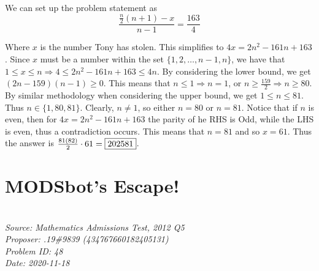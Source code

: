\documentclass[titlepage=true]{scrartcl}
\begin{document}
    \begin{solution}\hfil\medskip 
   
        We can set up the problem statement as 
        \begin{equation*}
            \frac{\frac{n}{2}(n+1)-x}{n-1}=\frac{163}{4}
        \end{equation*}
                
         Where \(x\) is the number Tony has stolen.
	 This simplifies to \(4x=2n^2-161n+163\).
	 Since \(x\) must be a number within the set \(\{1,2,\ldots,n-1,n\}\), we have that \(1\leq x\leq n\Rightarrow 4\leq 2n^2-161n+163\leq4n\).
	 By considering the lower bound, we get $(2n-159)(n-1)\geq 0$.
	 This means that \(n\leq 1\Rightarrow n=1\), or \(n\geq \frac{159}{2}\Rightarrow n\geq 80\).
	 By similar methodology when considering the upper bound, we get \(1\leq n\leq 81\).
	 Thus \(n\in\{1,80,81\}\).
	 Clearly, \(n\ne 1\), so either \(n=80\) or \(n=81\).
	 Notice that if \(n\) is even, then for \(4x=2n^2-161n+163\) the parity of he RHS is Odd, while the LHS is even, thus a contradiction occurs.
	 This means that \(n=81\) and so \(x=61\). Thus the answer is \(\frac{81(82)}{2}\cdot61=\fbox{202581}\).
    \end{solution}\bigskip

\newpage

\section{MODSbot's Escape!}

    \SSbreak\\
    \emph{Source: Mathematics Admissions Test, 2012 Q5}\\
    \emph{Proposer: .19\#9839 (434767660182405131)}\\
    \emph{Problem ID: 48}\\
    \emph{Date: 2020-11-18}\\
    \SSbreak
\end{document}

